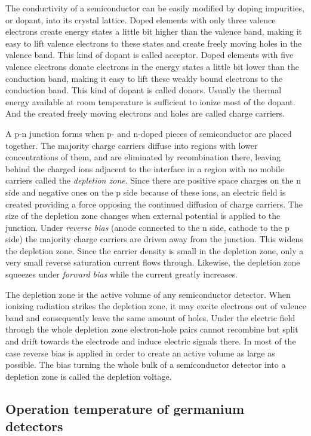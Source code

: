 The conductivity of a semiconductor can be easily modified by doping impurities, or dopant, into its crystal lattice. Doped elements with only three valence electrons create energy states a little bit higher than the valence band, making it easy to lift valence electrons to these states and create freely moving holes in the valence band. This kind of dopant is called acceptor. Doped elements with five valence electrons donate electrons in the energy states a little bit lower than the conduction band, making it easy to lift these weakly bound electrons to the conduction band. This kind of dopant is called donors. Usually the thermal energy available at room temperature is sufficient to ionize most of the dopant. And the created freely moving electrons and holes are called charge carriers.

A p-n junction forms when p- and n-doped pieces of semiconductor are placed together. The majority charge carriers diffuse into regions with lower concentrations of them, and are eliminated by recombination there, leaving behind the charged ions adjacent to the interface in a region with no mobile carriers called the \emph{depletion zone}. Since there are positive space charges on the n side and negative ones on the p side because of these ions, an electric field is created providing a force opposing the continued diffusion of charge carriers. The size of the depletion zone changes when external potential is applied to the junction. Under \emph{reverse bias} (anode connected to the n side, cathode to the p side) the majority charge carriers are driven away from the junction. This widens the depletion zone. Since the carrier density is small in the depletion zone, only a very small reverse saturation current flows through. Likewise, the depletion zone squeezes under \emph{forward bias} while the current greatly increases.

The depletion zone is the active volume of any semiconductor detector. When ionizing radiation strikes the depletion zone, it may excite  electrons out of valence band and consequently leave the same amount of holes. Under the electric field through the whole depletion zone electron-hole pairs cannot recombine but split and drift towards the electrode and induce electric signals there. In most of the case reverse bias is applied in order to create an active volume as large as possible. The bias turning the whole bulk of a semiconductor detector into a depletion zone is called the depletion voltage.

\subsection{Operation temperature of germanium detectors}
\label{sec:det:temp}

